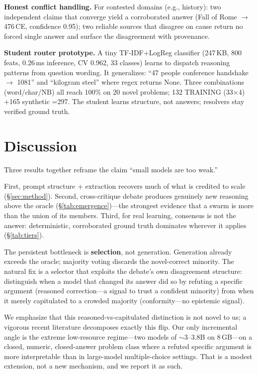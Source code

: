 \documentclass[conference,compsoc]{IEEEtran}
\begin{document}
\textbf{Honest conflict handling.} For contested domains (e.g., history): two independent claims that converge yield a corroborated answer (Fall of Rome $\rightarrow$ 476\,CE, confidence 0.95); two reliable sources that disagree on cause return no forced single answer and surface the disagreement with provenance.

\textbf{Student router prototype.} A tiny TF-IDF+LogReg classifier (247\,KB, 800 feats, 0.26\,ms inference, CV 0.962, 33 classes) learns to dispatch reasoning patterns from question wording. It generalizes: ``47 people conference handshake $\rightarrow$ 1081'' and ``kilogram steel'' where regex returns None. Three combinations (word/char/NB) all reach 100\% on 20 novel problems; 132 TRAINING (33$\times$4) +165 synthetic =297. The student learns structure, not answers; resolvers stay verified ground truth.

\section{Discussion}
Three results together reframe the claim ``small models are too weak.''

First, prompt structure + extraction recovers much of what is credited to scale (\S\ref{sec:method}). Second, cross-critique debate produces genuinely new reasoning above the oracle (\S\ref{tab:emergence})---the strongest evidence that a swarm is more than the union of its members. Third, for real learning, consensus is not the answer: deterministic, corroborated ground truth dominates wherever it applies (\S\ref{tab:tiers}).

The persistent bottleneck is \textbf{selection}, not generation. Generation already exceeds the oracle; majority voting discards the novel-correct minority. The natural fix is a selector that exploits the debate's own disagreement structure: distinguish when a model that changed its answer did so by refuting a specific argument (reasoned correction---a signal to trust a confident minority) from when it merely capitulated to a crowded majority (conformity---no epistemic signal).

We emphasize that this reasoned-vs-capitulated distinction is not novel to us; a vigorous recent literature decomposes exactly this flip\cite{hao2026not,bertalanic2026cost,wu2025can,ping2026why,atwell2025basil,feng2026good}. Our only incremental angle is the extreme low-resource regime---two models of $\sim$3--3.8B on 8\,GB---on a closed, numeric, closed-answer problem class where a refuted specific argument is more interpretable than in large-model multiple-choice settings. That is a modest extension, not a new mechanism, and we report it as such.
\end{document}
